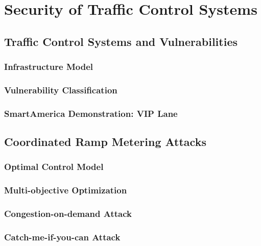 \chapter{Security of Traffic Control Systems}
\label{chapter:security}

\section{Traffic Control Systems and Vulnerabilities}

\subsection{Infrastructure Model}

\subsection{Vulnerability Classification}

\subsection{SmartAmerica Demonstration: VIP Lane}

\section{Coordinated Ramp Metering Attacks}

\subsection{Optimal Control Model}

\subsection{Multi-objective Optimization}

\subsection{Congestion-on-demand Attack}

\subsection{Catch-me-if-you-can Attack}